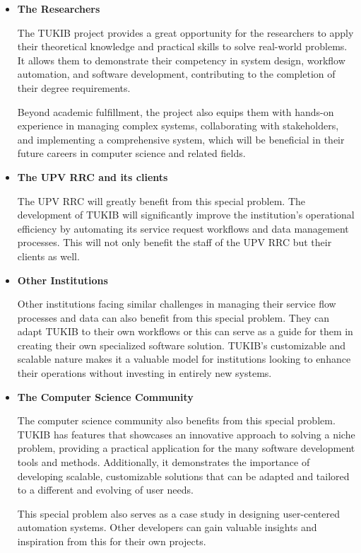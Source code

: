 \begin{itemize}
	
\item \textbf{The Researchers}

\subitem The TUKIB project provides a great opportunity for the researchers to apply their theoretical knowledge and practical skills to solve real-world problems. It allows them to demonstrate their competency in system design, workflow automation, and software development, contributing to the completion of their degree requirements.

\subitem Beyond academic fulfillment, the project also equips them with hands-on experience in managing complex systems, collaborating with stakeholders, and implementing a comprehensive system, which will be beneficial in their future careers in computer science and related fields.\newline

\item \textbf{The UPV RRC and its clients}

\subitem The UPV RRC will greatly benefit from this special problem. The development of TUKIB will significantly improve the institution's operational efficiency by automating its service request workflows and data management processes. This will not only benefit the staff of the UPV RRC but their clients as well.\newline

\item \textbf{Other Institutions}

\subitem Other institutions facing similar challenges in managing their service flow processes and data can also benefit from this special problem. They can adapt TUKIB to their own workflows or this can serve as a guide for them in creating their own specialized software solution. TUKIB’s customizable and scalable nature makes it a valuable model for institutions looking to enhance their operations without investing in entirely new systems.\newline

\item \textbf{The Computer Science Community}

\subitem The computer science community also benefits from this special problem. TUKIB has features that showcases an innovative approach to solving a niche problem, providing a practical application for the many software development tools and methods. Additionally, it demonstrates the importance of developing scalable, customizable solutions that can be adapted and tailored to a different and evolving of user needs.

\subitem This special problem also serves as a case study in designing user-centered automation systems. Other developers can gain valuable insights and inspiration from this for their own projects.

\end {itemize}

